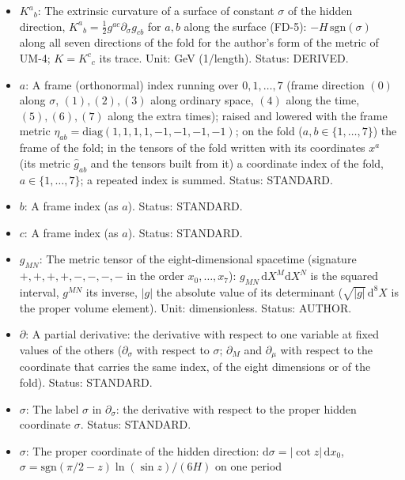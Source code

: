\documentclass[
  10pt,
]{article}
\providecommand{\tightlist}{%
  \setlength{\itemsep}{0pt}\setlength{\parskip}{0pt}}
\begin{document}
\begin{itemize}
\tightlist
\item
  \(K^a{}_b\): The extrinsic curvature of a surface of constant
  \(\sigma\) of the hidden direction,
  \(K^a{}_b = \frac12 g^{ac}\partial_\sigma g_{cb}\) for \(a, b\) along
  the surface (FD-5): \(-H\,\mathrm{sgn}(\sigma)\) along all seven
  directions of the fold for the author's form of the metric of UM-4;
  \(K = K^c{}_c\) its trace. Unit: GeV (1/length). Status: DERIVED.
\item
  \(a\): A frame (orthonormal) index running over \(0, 1, \dots, 7\)
  (frame direction \((0)\) along \(\sigma\), \((1), (2), (3)\) along
  ordinary space, \((4)\) along the time, \((5), (6), (7)\) along the
  extra times); raised and lowered with the frame metric
  \(\eta_{ab} = \mathrm{diag}(1, 1, 1, 1, -1, -1, -1, -1)\); on the fold
  (\(a, b \in \{1, \dots, 7\}\)) the frame of the fold; in the tensors
  of the fold written with its coordinates \(x^a\) (its metric
  \(\hat g_{ab}\) and the tensors built from it) a coordinate index of
  the fold, \(a \in \{1, \dots, 7\}\); a repeated index is summed.
  Status: STANDARD.
\item
  \(b\): A frame index (as \(a\)). Status: STANDARD.
\item
  \(c\): A frame index (as \(a\)). Status: STANDARD.
\item
  \(g_{MN}\): The metric tensor of the eight-dimensional spacetime
  (signature \(+,+,+,+,-,-,-,-\) in the order \(x_0, \dots, x_7\)):
  \(g_{MN}\,\mathrm{d}X^M\mathrm{d}X^N\) is the squared interval,
  \(g^{MN}\) its inverse, \(\lvert g\rvert\) the absolute value of its
  determinant (\(\sqrt{\lvert g\rvert}\,\mathrm{d}^8X\) is the proper
  volume element). Unit: dimensionless. Status: AUTHOR.
\item
  \(\partial\): A partial derivative: the derivative with respect to one
  variable at fixed values of the others (\(\partial_\sigma\) with
  respect to \(\sigma\); \(\partial_M\) and \(\partial_\mu\) with
  respect to the coordinate that carries the same index, of the eight
  dimensions or of the fold). Status: STANDARD.
\item
  \(\sigma\): The label \(\sigma\) in \(\partial_\sigma\): the
  derivative with respect to the proper hidden coordinate \(\sigma\).
  Status: STANDARD.
\item
  \(\sigma\): The proper coordinate of the hidden direction:
  \(\mathrm{d}\sigma = \lvert\cot z\rvert\,\mathrm{d}x_0\),
  \(\sigma = \mathrm{sgn}(\pi/2 - z)\ln(\sin z)/(6H)\) on one period

\end{itemize}
\end{document}
